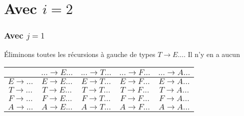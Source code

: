 \documentclass[class=article]{standalone}
\begin{document}
\section*{Avec $i = 2$}
\subsubsection*{Avec $j = 1$}
Éliminons toutes les récursions à gauche de types $T \rightarrow E...$. Il n'y en a aucun
\begin{center}
    \begin{tabular}{c|c|c|c|c|}
        \cellcolor[HTML]{FFFFFF}                     & 
        \cellcolor[HTML]{FFFFFF} $... \rightarrow E...$ &
        \cellcolor[HTML]{FFFFFF} $... \rightarrow T...$ & 
        \cellcolor[HTML]{FFFFFF} $... \rightarrow F...$ & 
        \cellcolor[HTML]{FFFFFF} $... \rightarrow A...$ \\
    \hline
        \cellcolor[HTML]{FFFFFF} $E \rightarrow ...$ & 
        \cellcolor[HTML]{FF0000} $E \rightarrow E...$ & 
        \cellcolor[HTML]{ABFF00} $E \rightarrow T...$ & 
        \cellcolor[HTML]{ABFF00} $E \rightarrow F...$ & 
        \cellcolor[HTML]{ABFF00} $E \rightarrow A...$ \\
    \hline
        \cellcolor[HTML]{FFFFFF} $T \rightarrow ...$ & 
        \cellcolor[HTML]{FF0000} $T \rightarrow E...$ & 
        \cellcolor[HTML]{FFFFFF} $T \rightarrow T...$ & 
        \cellcolor[HTML]{ABFF00} $T \rightarrow F...$ &
        \cellcolor[HTML]{ABFF00} $T \rightarrow A...$ \\
    \hline
        \cellcolor[HTML]{FFFFFF} $F \rightarrow ...$ &
        \cellcolor[HTML]{FFFFFF} $F \rightarrow E...$ &
        \cellcolor[HTML]{FFFFFF} $F \rightarrow T...$ & 
        \cellcolor[HTML]{FFFFFF} $F \rightarrow F...$ & 
        \cellcolor[HTML]{ABFF00} $F \rightarrow A...$ \\
    \hline
        \cellcolor[HTML]{FFFFFF} $A \rightarrow ...$ & 
        \cellcolor[HTML]{FFFFFF} $A \rightarrow E...$ & 
        \cellcolor[HTML]{FFFFFF} $A \rightarrow T...$ & 
        \cellcolor[HTML]{FFFFFF} $A \rightarrow F...$ & 
        \cellcolor[HTML]{FFFFFF} $A \rightarrow A...$ \\
    \hline
    \end{tabular}
\end{center}
\end{document}

